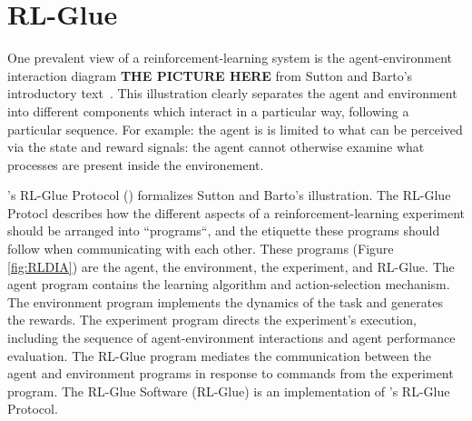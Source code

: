 \documentclass[twoside,11pt]{article}
\begin{document}
	 

\section{RL-Glue}

One prevalent view of a reinforcement-learning system is the agent-environment interaction diagram \textbf{THE PICTURE HERE} from Sutton and Barto's introductory text~\citeyear{rlbook}.  This illustration clearly separates the agent and environment into different components which interact in a particular way, following a particular sequence.  For example: the agent is is limited to what can be perceived via the state and reward signals: the agent cannot otherwise examine what processes are present inside the environement. %

\citeauthor{whiteThesis}'s RL-Glue Protocol (\citeyear{whiteThesis}) formalizes Sutton and Barto's illustration.  The RL-Glue Protocl describes how the different aspects of a reinforcement-learning experiment should be arranged into ``programs``, and the etiquette these programs should follow when communicating with each other. These programs (Figure \ref{fig:RLDIA}) are the agent, the environment, the experiment, and RL-Glue.  The agent program contains the learning algorithm and action-selection mechanism. The environment program implements the dynamics of the task and generates the rewards. The experiment program directs the experiment's execution, including the sequence of agent-environment interactions and agent performance evaluation.  The RL-Glue program mediates the communication between the agent and environment programs in response to commands from the experiment program. The RL-Glue Software (RL-Glue) is an implementation of \citeauthor{whiteThesis}'s RL-Glue Protocol. 
\end{document}
